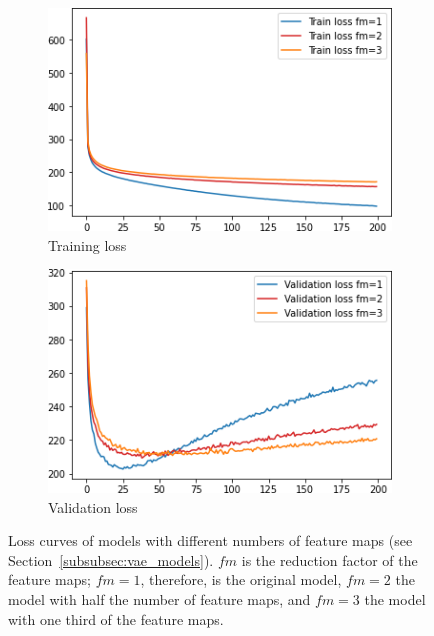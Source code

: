 \begin{figure}
    \centering
    \begin{subfigure}{.45\textwidth}
        \centering
        \includegraphics[width=\textwidth]{images/sparseness/sparseness_train_loss.png}
        \caption{Training loss}
    \end{subfigure}
    \hfill
    \begin{subfigure}{.45\textwidth}
        \centering
        \includegraphics[width=\textwidth]{images/sparseness/sparseness_validation_loss.png}
        \caption{Validation loss}
    \end{subfigure}
    \caption[Sparse Models - Loss Curves]{Loss curves of models with different numbers of feature maps (see Section~\ref{subsubsec:vae_models}). $fm$ is the reduction factor of the feature maps; $fm=1$, therefore, is the original model, $fm=2$ the model with half the number of feature maps, and $fm=3$ the model with one third of the feature maps.}
    \label{fig:learning_curves_sparseness}
\end{figure}

